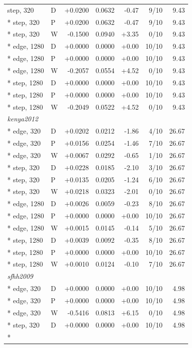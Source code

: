 \begin{longtable}{llrrrrr}
step, 320 & D & +0.0200 & 0.0632 & -0.47 & 9/10 & 9.43\\*
step, 320 & P & +0.0200 & 0.0632 & -0.47 & 9/10 & 9.43\\*
step, 320 & W & -0.1500 & 0.0940 & +3.35 & 0/10 & 9.43\\*
edge, 1280 & D & +0.0000 & 0.0000 & +0.00 & 10/10 & 9.43\\*
edge, 1280 & P & +0.0000 & 0.0000 & +0.00 & 10/10 & 9.43\\*
edge, 1280 & W & -0.2057 & 0.0554 & +4.52 & 0/10 & 9.43\\*
step, 1280 & D & +0.0000 & 0.0000 & +0.00 & 10/10 & 9.43\\*
step, 1280 & P & +0.0000 & 0.0000 & +0.00 & 10/10 & 9.43\\*
step, 1280 & W & -0.2049 & 0.0522 & +4.52 & 0/10 & 9.43\\
\multicolumn{7}{l}{\textit{kenya2012}}\\*
edge, 320 & D & +0.0202 & 0.0212 & -1.86 & 4/10 & 26.67\\*
edge, 320 & P & +0.0156 & 0.0254 & -1.46 & 7/10 & 26.67\\*
edge, 320 & W & +0.0067 & 0.0292 & -0.65 & 1/10 & 26.67\\*
step, 320 & D & +0.0228 & 0.0185 & -2.10 & 3/10 & 26.67\\*
step, 320 & P & +0.0135 & 0.0205 & -1.24 & 6/10 & 26.67\\*
step, 320 & W & +0.0218 & 0.0323 & -2.01 & 0/10 & 26.67\\*
edge, 1280 & D & +0.0026 & 0.0059 & -0.23 & 8/10 & 26.67\\*
edge, 1280 & P & +0.0000 & 0.0000 & +0.00 & 10/10 & 26.67\\*
edge, 1280 & W & +0.0015 & 0.0145 & -0.14 & 5/10 & 26.67\\*
step, 1280 & D & +0.0039 & 0.0092 & -0.35 & 8/10 & 26.67\\*
step, 1280 & P & +0.0000 & 0.0000 & +0.00 & 10/10 & 26.67\\*
step, 1280 & W & +0.0010 & 0.0124 & -0.10 & 7/10 & 26.67\\
\multicolumn{7}{l}{\textit{sfhh2009}}\\*
edge, 320 & D & +0.0000 & 0.0000 & +0.00 & 10/10 & 4.98\\*
edge, 320 & P & +0.0000 & 0.0000 & +0.00 & 10/10 & 4.98\\*
edge, 320 & W & -0.5416 & 0.0813 & +6.15 & 0/10 & 4.98\\*
step, 320 & D & +0.0000 & 0.0000 & +0.00 & 10/10 & 4.98\\*

\end{longtable}
